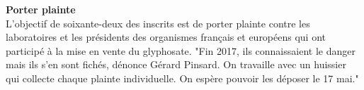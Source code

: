 \documentclass[8pt]{article}
\begin{document}
\textbf{Porter plainte}\\

L’objectif de soixante-deux des inscrits est de porter plainte contre les laboratoires et les présidents des organismes français et européens qui ont participé à la mise en vente du glyphosate. "Fin 2017, ils connaissaient le danger mais ils s’en sont fichés, dénonce Gérard Pinsard. On travaille avec un huissier qui collecte chaque plainte individuelle. On espère pouvoir les déposer le 17 mai."
\end{document}
